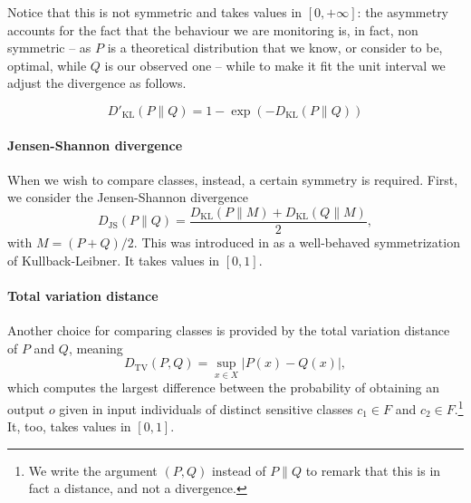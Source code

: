 \documentclass[
]{ceurart}
\begin{document}
Notice that this is not symmetric and takes values in $[0,+\infty]$: the asymmetry accounts for the fact that the behaviour we are monitoring is, in fact, non symmetric -- as $P$ is a theoretical distribution that we know, or consider to be, optimal, while $Q$ is our observed one -- while to make it fit the unit interval we adjust the divergence as follows.

\[D'_{\mathrm{KL}}(P\parallel Q)=1-\exp (- D_{\mathrm{KL}}(P\parallel Q))\]

\paragraph{Jensen-Shannon divergence}
When we wish to compare classes, instead, a certain symmetry is required. First, we consider the Jensen-Shannon divergence 
\[D_{\mathrm{JS}}(P\parallel Q)=\frac{D_{\mathrm{KL}}(P\parallel M)+D_{\mathrm{KL}}(Q\parallel M)}{2},\]
with $M=(P+Q)/2$. This was introduced in \cite{lin_divergence} as a well-behaved symmetrization of Kullback-Leibner. It takes values in $[0,1]$.

\paragraph{Total variation distance}
Another choice for comparing classes is provided by the total variation distance of $P$ and $Q$, meaning
\[D_{\mathrm{TV}}(P, Q)= \sup _{x\in X} \vert P(x) - Q(x)\vert,\]
which computes the largest difference between the probability of obtaining an output $o$ given in input individuals of distinct sensitive classes $c_1\in F$ and $c_2\in F$.\footnote{We write the argument $(P,Q)$ instead of $P\parallel Q$ to remark that this is in fact a distance, and not a divergence.}  It, too, takes values in $[0,1]$. %

%

%
\end{document}
